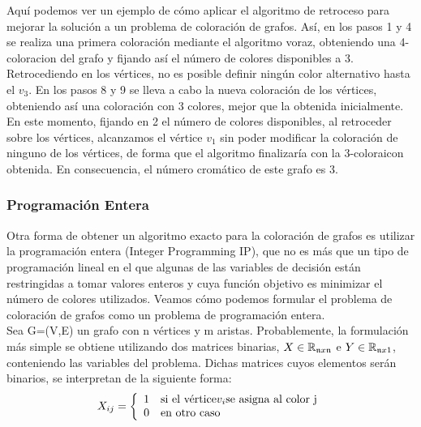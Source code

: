 \documentclass[12pt]{report}
\begin{document}
Aquí podemos ver un ejemplo de cómo aplicar el algoritmo de retroceso para mejorar la solución a un problema de coloración de grafos. Así, en los pasos 1 y 4 se realiza una primera coloración mediante el algoritmo voraz, obteniendo una 4-coloracion del grafo y fijando así el número de colores disponibles a 3. Retrocediendo en los vértices, no es posible definir ningún color alternativo hasta el $v_3$. En los pasos 8 y 9 se lleva a cabo la nueva coloración de los vértices, obteniendo así una coloración con 3 colores, mejor que la obtenida inicialmente. En este momento, fijando en 2 el número de colores disponibles, al retroceder sobre los vértices, alcanzamos el vértice $v_1$ sin poder modificar la coloración de ninguno de los vértices, de forma que el algoritmo finalizaría con la 3-coloraicon obtenida. En consecuencia, el número cromático de este grafo es 3.

\subsubsection{Programación Entera}
Otra forma de obtener un algoritmo exacto para la coloración de grafos es utilizar la programación entera (Integer Programming IP), que no es más que un tipo de programación lineal en el que algunas de las variables de decisión están restringidas a tomar valores enteros y cuya función objetivo es minimizar el número de colores utilizados. Veamos cómo podemos formular el problema de coloración de grafos como un problema de programación entera.\\
Sea G=(V,E) un grafo con n vértices y m aristas. Probablemente, la formulación más simple se obtiene utilizando dos matrices binarias, $X \in \mathbb{R}_{\mathfrak{n}\mathnormal{x}\mathfrak{n}} $ e $Y \in \mathbb{R}_{\mathfrak{n}\mathnormal{x}1}$, conteniendo las variables del problema. Dichas matrices cuyos elementos serán binarios, se interpretan de la siguiente forma:\\
\begin{equation}
     X_{ij} = \left\{
	       \begin{array}{ll}
			1 	& 	$si el vértice$ v_i $se asigna al color j$\\
			0   &	$en otro caso$\\
	       \end{array}
	     \right.
\end{equation}
\end{document}
